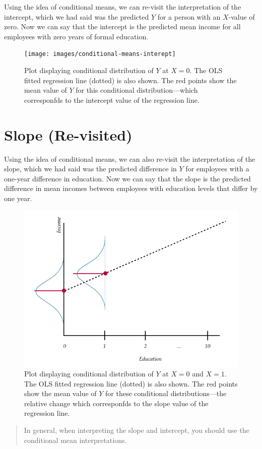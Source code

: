 \documentclass[]{book}
\theoremstyle{definition}
\theoremstyle{definition}
\theoremstyle{definition}
\theoremstyle{remark}
\begin{document}
Using the idea of conditional means, we can re-visit the interpretation
of the intercept, which we had said was the predicted \(Y\) for a person
with an \(X\)-value of zero. Now we can say that the intercept is the
predicted mean income for all employees with zero years of formal
education.

\begin{figure}
\texttt{[image: images/conditional-means-interept]} \caption{Plot displaying conditional distribution of $Y$ at $X=0$. The OLS fitted regression line (dotted) is also shown. The red points show the mean value of $Y$ for this conditional distribution---which corresponfds to the intercept value of the regression line.}\label{fig:unnamed-chunk-17}
\end{figure}

\hypertarget{slope-re-visited}{%
\section{Slope (Re-visited)}\label{slope-re-visited}}

Using the idea of conditional means, we can also re-visit the
interpretation of the slope, which we had said was the predicted
difference in \(Y\) for employees with a one-year difference in
education. Now we can say that the slope is the predicted difference in
mean incomes between employees with education levels that differ by one
year.

\begin{figure}
\includegraphics[width=0.5\linewidth]{images/conditional-means-slope} \caption{Plot displaying conditional distribution of $Y$ at $X=0$ and $X=1$. The OLS fitted regression line (dotted) is also shown. The red points show the mean value of $Y$ for these conditional distributions---the relative change which corresponfds to the slope value of the regression line.}\label{fig:unnamed-chunk-18}
\end{figure}

\begin{quote}
In general, when interpreting the slope and intercept, you should use
the conditional mean interpretations.
\end{quote}
\end{document}
